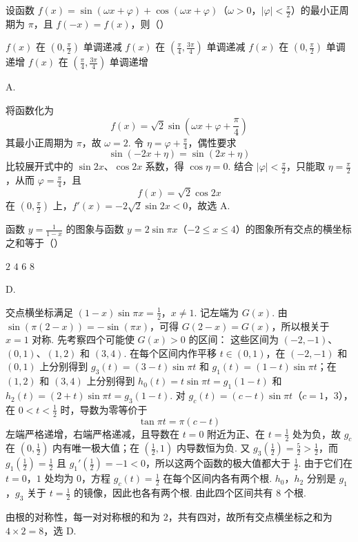 \begin{problem}
设函数 \( f(x) = \sin\left(\omega x + \varphi\right) + \cos\left(\omega x + \varphi\right) \)（\(\omega > 0\)，\(|\varphi| < \frac{\pi}{2}\)）的最小正周期为 \( \pi \)，且 \( f(-x) = f(x) \)，则（\quad）

\choices
    {\(f(x)\) 在 \(\left(0, \frac{\pi}{2}\right)\) 单调递减}
    {\(f(x)\) 在 \(\left(\frac{\pi}{4}, \frac{3\pi}{4}\right)\) 单调递减}
    {\(f(x)\) 在 \(\left(0, \frac{\pi}{2}\right)\) 单调递增}
    {\(f(x)\) 在 \(\left(\frac{\pi}{4}, \frac{3\pi}{4}\right)\) 单调递增}
\end{problem}

\begin{answer}
A.
\end{answer}

\begin{solution}
将函数化为
\[
f(x)=\sqrt2\sin\left(\omega x+\varphi+\frac\pi4\right)
\]
其最小正周期为 \(\pi\)，故 \(\omega=2\). 令 \(\eta=\varphi+\frac\pi4\)，偶性要求
\[
\sin(-2x+\eta)=\sin(2x+\eta)
\]
比较展开式中的 \(\sin2x\)、\(\cos2x\) 系数，得 \(\cos\eta=0\). 结合 \(|\varphi|<\frac\pi2\)，只能取 \(\eta=\frac\pi2\)，从而 \(\varphi=\frac\pi4\)，且
\[
f(x)=\sqrt2\cos2x
\]
在 \(\left(0,\frac\pi2\right)\) 上，\(f'(x)=-2\sqrt2\sin2x<0\)，故选 A.
\end{solution}

\begin{problem}
函数 \( y = \frac{1}{1 - x} \) 的图象与函数 \( y = 2\sin \pi x \)（\(-2 \leqslant x \leqslant 4\)）的图象所有交点的横坐标之和等于（\quad）

\choices
    {\(2\)}
    {\(4\)}
    {\(6\)}
    {\(8\)}
\end{problem}

\begin{answer}
D.
\end{answer}

\begin{solution}
交点横坐标满足
\((1-x)\sin\pi x=\frac12\)，\(x\ne1\).
记左端为 \(G(x)\). 由 \(\sin(\pi(2-x))=-\sin(\pi x)\)，可得 \(G(2-x)=G(x)\)，所以根关于 \(x=1\) 对称. 先考察四个可能使 \(G(x)>0\) 的区间：
这些区间为 \((-2,-1)\)、\((0,1)\)、\((1,2)\) 和 \((3,4)\).
在每个区间内作平移 \(t\in(0,1)\)，在 \((-2,-1)\) 和 \((0,1)\) 上分别得到 \(g_3(t)=(3-t)\sin\pi t\) 和 \(g_1(t)=(1-t)\sin\pi t\)；在 \((1,2)\) 和 \((3,4)\) 上分别得到 \(h_0(t)=t\sin\pi t=g_1(1-t)\) 和 \(h_2(t)=(2+t)\sin\pi t=g_3(1-t)\).
对 \(g_c(t)=(c-t)\sin\pi t\)（\(c=1\)，\(3\)），在 \(0<t<\frac12\) 时，导数为零等价于
\[
\tan\pi t=\pi(c-t)
\]
左端严格递增，右端严格递减，且导数在 \(t=0\) 附近为正、在 \(t=\frac12\) 处为负，故 \(g_c\) 在 \(\left(0,\frac12\right)\) 内有唯一极大值；在 \(\left(\frac12,1\right)\) 内导数恒为负. 又 \(g_3(\frac12)=\frac52>\frac12\)，而 \(g_1(\frac12)=\frac12\) 且 \(g_1'(\frac12)=-1<0\)，所以这两个函数的极大值都大于 \(\frac12\). 由于它们在 \(t=0\)，\(1\) 处均为 \(0\)，方程 \(g_c(t)=\frac12\) 在每个区间内各有两个根. \(h_0\)，\(h_2\) 分别是 \(g_1\)，\(g_3\) 关于 \(t=\frac12\) 的镜像，因此也各有两个根. 由此四个区间共有 \(8\) 个根.

由根的对称性，每一对对称根的和为 \(2\)，共有四对，故所有交点横坐标之和为 \(4\times2=8\)，选 D.
\end{solution}

